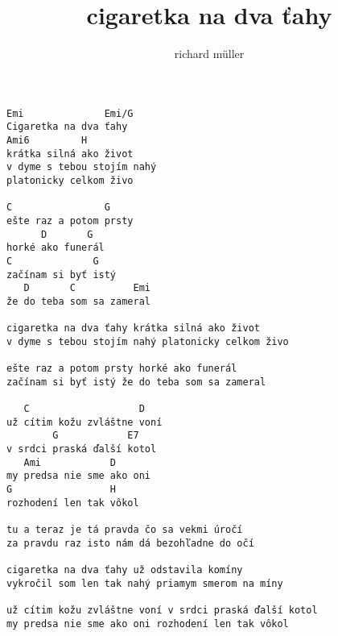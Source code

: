 \author{richard m\"uller}
\title{cigaretka na dva ťahy}
\maketitle
\begin{verbatim}
Emi              Emi/G
Cigaretka na dva ťahy
Ami6         H
krátka silná ako život
v dyme s tebou stojím nahý
platonicky celkom živo

C                G
ešte raz a potom prsty
      D       G
horké ako funerál
C              G
začínam si byť istý
   D       C          Emi
že do teba som sa zameral

cigaretka na dva ťahy krátka silná ako život
v dyme s tebou stojím nahý platonicky celkom živo

ešte raz a potom prsty horké ako funerál
začínam si byť istý že do teba som sa zameral

   C                   D
už cítim kožu zvláštne voní
        G            E7
v srdci praská ďalší kotol
   Ami            D
my predsa nie sme ako oni
G                 H
rozhodení len tak vôkol

tu a teraz je tá pravda čo sa vekmi úročí
za pravdu raz isto nám dá bezohľadne do očí

cigaretka na dva ťahy už odstavila komíny
vykročil som len tak nahý priamym smerom na míny

už cítim kožu zvláštne voní v srdci praská ďalší kotol
my predsa nie sme ako oni rozhodení len tak vôkol 
\end{verbatim}